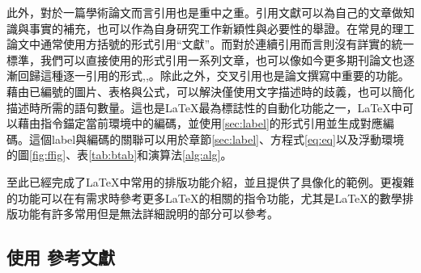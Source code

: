 \documentclass[12pt]{report}
\theoremstyle{plain}
\begin{document}
此外，對於一篇學術論文而言引用也是重中之重。引用文獻可以為自己的文章做知識與事實的補充，也可以作為自身研究工作新穎性與必要性的舉證。在常見的理工論文中通常使用方括號的形式引用``文獻''\cite{ieeerefguide}。而對於連續引用而言則沒有詳實的統一標準，我們可以直接使用\cite{cho2025resource,cho2024efficient,cho2022downlink}的形式引用一系列文章，也可以像如今更多期刊論文也逐漸回歸這種逐一引用的形式\cite{cho2025resource},\cite{cho2024efficient},\cite{cho2022downlink}。除此之外，交叉引用也是論文撰寫中重要的功能。藉由已編號的圖片、表格與公式，可以解決僅使用文字描述時的歧義，也可以簡化描述時所需的語句數量。這也是\LaTeX 最為標誌性的自動化功能之一，\LaTeX 中可以藉由指令錨定當前環境中的編碼，並使用\ref{sec:label}的形式引用並生成對應編碼。這個label與編碼的關聯可以用於章節\ref{sec:label}、方程式\eqref{eq:eq}以及浮動環境的圖\ref{fig:ffig}、表\ref{tab:btab}和演算法\ref{alg:alg}。

至此已經完成了\LaTeX 中常用的排版功能介紹，並且提供了具像化的範例。更複雜的功能可以在有需求時參考更多\LaTeX 的相關的指令功能，尤其是\LaTeX 的數學排版功能有許多常用但是無法詳細說明的部分可以參考\cite{latexmath}。

\subsection{使用 \BibTeX 參考文獻}
\end{document}
